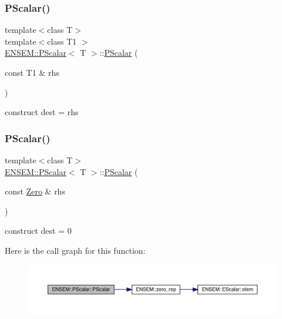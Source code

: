 \subsubsection{\texorpdfstring{PScalar()}{PScalar()}\hspace{0.1cm}{\footnotesize\ttfamily [4/12]}}
{\footnotesize\ttfamily template$<$class T$>$ \\
template$<$class T1 $>$ \\
\mbox{\hyperlink{classENSEM_1_1PScalar}{E\+N\+S\+E\+M\+::\+P\+Scalar}}$<$ T $>$\+::\mbox{\hyperlink{classENSEM_1_1PScalar}{P\+Scalar}} (\begin{DoxyParamCaption}\item[{const T1 \&}]{rhs }\end{DoxyParamCaption})\hspace{0.3cm}{\ttfamily [inline]}}



construct dest = rhs 

\mbox{\label{classENSEM_1_1PScalar_a9d7f56a0caeb05ee423b451d2f3aae3b}} 
\subsubsection{\texorpdfstring{PScalar()}{PScalar()}\hspace{0.1cm}{\footnotesize\ttfamily [5/12]}}
{\footnotesize\ttfamily template$<$class T$>$ \\
\mbox{\hyperlink{classENSEM_1_1PScalar}{E\+N\+S\+E\+M\+::\+P\+Scalar}}$<$ T $>$\+::\mbox{\hyperlink{classENSEM_1_1PScalar}{P\+Scalar}} (\begin{DoxyParamCaption}\item[{const \mbox{\hyperlink{structENSEM_1_1Zero}{Zero}} \&}]{rhs }\end{DoxyParamCaption})\hspace{0.3cm}{\ttfamily [inline]}}



construct dest = 0 

Here is the call graph for this function\+:
\nopagebreak
\begin{figure}[H]
\begin{center}
\leavevmode
\includegraphics[width=350pt]{d3/d27/classENSEM_1_1PScalar_a9d7f56a0caeb05ee423b451d2f3aae3b_cgraph}
\end{center}
\end{figure}
\mbox{\label{classENSEM_1_1PScalar_a2bf292f92c6654475bf2bc93c48adcd1}} 
